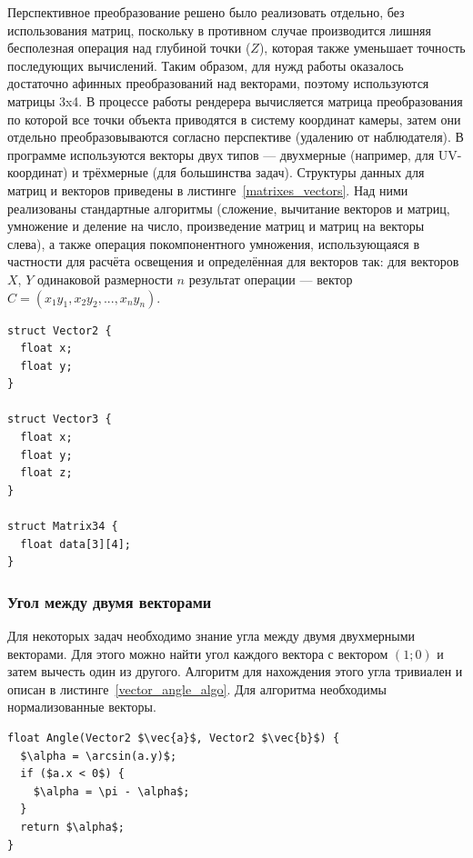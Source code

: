 \documentclass[a4paper,12pt]{report}
\numberwithin{equation}{section}
\begin{document}
Перспективное преобразование решено было реализовать отдельно, без использования матриц, поскольку в противном случае производится лишняя бесполезная операция над глубиной точки ($Z$), которая также уменьшает точность последующих вычислений. Таким образом, для нужд работы оказалось достаточно афинных преобразований над векторами, поэтому используются матрицы 3x4. В процессе работы рендерера вычисляется матрица преобразования по которой все точки объекта приводятся в систему координат камеры, затем они отдельно преобразовываются согласно перспективе (удалению от наблюдателя). В программе используются векторы двух типов --- двухмерные (например, для UV-координат) и трёхмерные (для большинства задач). Структуры данных для матриц и векторов приведены в листинге~\ref{matrixes_vectors}. Над ними реализованы стандартные алгоритмы (сложение, вычитание векторов и матриц, умножение и деление на число, произведение матриц и матриц на векторы слева), а также операция покомпонентного умножения, использующаяся в частности для расчёта освещения и определённая для векторов так: для векторов $X$, $Y$ одинаковой размерности $n$ результат операции --- вектор $C = (x_1 y_1, x_2 y_2, ..., x_n y_n)$.

\begin{lstlisting}[float=p,caption={Структуры данных ``Вектор'' и ``Матрица''},label=matrixes_vectors]
struct Vector2 {
  float x;
  float y;
}

struct Vector3 {
  float x;
  float y;
  float z;
}

struct Matrix34 {
  float data[3][4];
}
\end{lstlisting}

\subsubsection{Угол между двумя векторами}
Для некоторых задач необходимо знание угла между двумя двухмерными векторами. Для этого можно найти угол каждого вектора с вектором $(1; 0)$ и затем вычесть один из другого. Алгоритм для нахождения этого угла тривиален и описан в листинге~\ref{vector_angle_algo}. Для алгоритма необходимы нормализованные векторы.

\begin{lstlisting}[float=p,caption={Угол между вектором и $(1; 0)$},label=vector_angle_algo]
float Angle(Vector2 $\vec{a}$, Vector2 $\vec{b}$) {
  $\alpha = \arcsin(a.y)$;
  if ($a.x < 0$) {
    $\alpha = \pi - \alpha$;
  }
  return $\alpha$;
}
\end{lstlisting}
\end{document}
